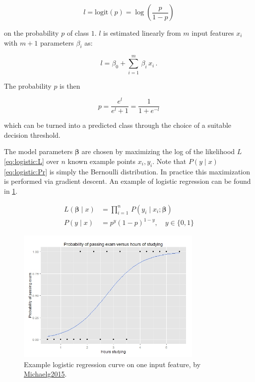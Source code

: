 \begin{equation}\label{eq:logistic:logic}
l = \text{logit}\left(p\right) = \log\left(\frac{p}{1-p}\right)
\end{equation}

\noindent on the probability $p$ of class $1$.
$l$ is estimated linearly from $m$ input features $x_{i}$ with $m+1$ parameters $\beta_{i}$ as:

\begin{equation}\label{eq:logistic:logicBeta}
l = \beta_{0} + \sum_{i=1}^{m} \, \beta_{i}\,x_{i}\,.
\end{equation}

\noindent The probability $p$ is then

\begin{equation}\label{eq:logistic:p}
p = \frac{e^l}{e^l + 1} = \frac{1}{1+e^{-l}}
\end{equation}

\noindent which can be turned into a predicted class through the choice of a suitable decision threshold.

The model parameters $\bm{\beta}$ are chosen by maximizing
the log of the likelihood $L$ \cref{eq:logistic:L} over $n$ known example points $x_{i}, y_{i}$.
Note that $P\left(y \mid x\right)$ \cref{eq:logistic:Pr} is simply the Bernoulli distribution.
In practice this maximization is performed via gradient descent.
An example of logistic regression can be found in \cref{fig:logistic_regression_ex}.

\begin{subequations} \label{eq:logistic:L_Pr}
\begin{align}
L\left(\bm{\beta} \mid x\right) &= \prod_{i=1}^{n} \, P\left(y_{i} \mid x_{i}; \bm{\beta}\right) \label{eq:logistic:L} \\
P\left(y \mid x\right) &= p^y\left(1-p\right)^{1-y}, \quad y \in \{0, 1\} \label{eq:logistic:Pr}
\end{align}
\end{subequations}

\begin{figure}
\centering
\includegraphics[width=0.8\textwidth]{figures/regression/Exam_pass_logistic_curve.jpeg}
\caption{
Example logistic regression curve on one input feature, by \href{https://en.wikipedia.org/wiki/File:Exam_pass_logistic_curve.jpeg}{Michaelg2015}.
}
\label{fig:logistic_regression_ex}
\end{figure}

